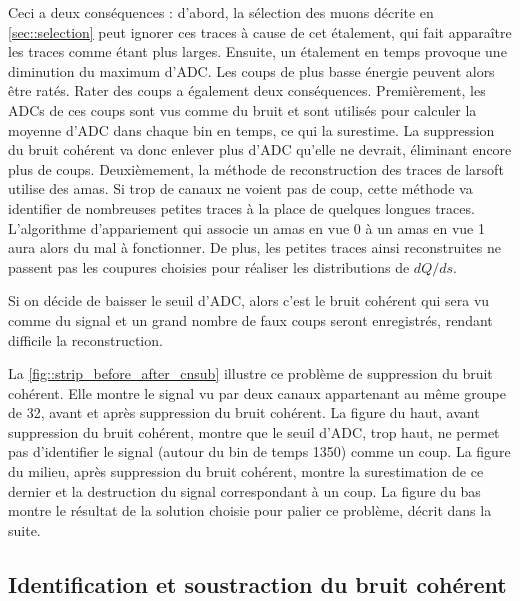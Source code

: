       Ceci a deux conséquences : d'abord, la sélection des muons décrite en \autoref{sec::selection} peut ignorer ces traces à cause de cet étalement, qui fait apparaître les traces comme étant plus larges. Ensuite, un étalement en temps provoque une diminution du maximum d'ADC. Les coups de plus basse énergie peuvent alors être ratés. Rater des coups a également deux conséquences. Premièrement, les ADCs de ces coups sont vus comme du bruit et sont utilisés pour calculer la moyenne d'ADC dans chaque bin en temps, ce qui la surestime. La suppression du bruit cohérent va donc enlever plus d'ADC qu'elle ne devrait, éliminant encore plus de coups.  Deuxièmement, la méthode de reconstruction des traces de \gls{larsoft} utilise des amas. Si trop de canaux ne voient pas de coup, cette méthode va identifier de nombreuses petites traces à la place de quelques longues traces. L'algorithme d'appariement qui associe un amas en vue 0 à un amas en vue 1 aura alors du mal à fonctionner. De plus, les petites traces ainsi reconstruites ne passent pas les coupures choisies pour réaliser les distributions de $dQ/ds$.

      Si on décide de baisser le seuil d'ADC, alors c'est le bruit cohérent qui sera vu comme du signal et un grand nombre de faux coups seront enregistrés, rendant difficile la reconstruction.

      La \autoref{fig::strip_before_after_cnsub} illustre ce problème de suppression du bruit cohérent. Elle montre le signal vu par deux canaux appartenant au même groupe de 32, avant et après suppression du bruit cohérent. La figure du haut, avant suppression du bruit cohérent, montre que le seuil d'ADC, trop haut, ne permet pas d'identifier le signal (autour du bin de temps 1350) comme un coup.  La figure du milieu, après suppression du bruit cohérent, montre la surestimation de ce dernier et la destruction du signal correspondant à un coup. La figure du bas montre le résultat de la solution choisie pour palier ce problème, décrit dans la suite.

    \subsection{Identification et soustraction du bruit cohérent}

